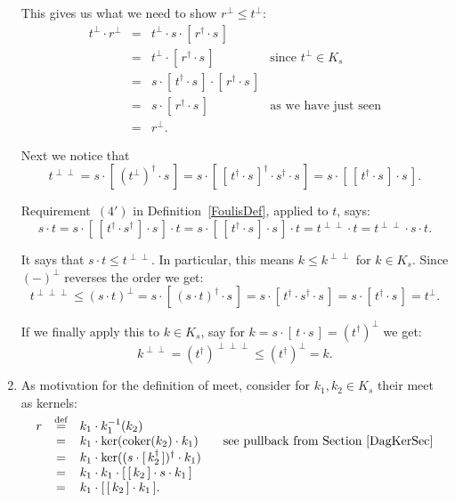 \documentclass{article}
\newenvironment{proof}[1][Proof]{ \begin{trivlist}\item[\hskip \labelsep {\bfseries #1}]}{ \end{trivlist}}
\newcommand{\coker}{\ensuremath{\mathrm{coker}}}
\newcommand{\sai}[1]{[\,#1\,]}
\begin{document}
\begin{proof}
\begin{enumerate}
\noindent This gives us what we need to show $r^{\perp} \leq t^{\perp}$:
$$\begin{array}{rcll}
t^{\perp}\cdot r^{\perp}
& = &
t^{\perp} \cdot s\cdot \sai{r^{\dag}\cdot s} \\
& = &
t^{\perp} \cdot \sai{r^{\dag}\cdot s} 
   & \mbox{since $t^{\perp}\in K_s$} \\
& = &
s\cdot \sai{t^{\dag}\cdot s}\cdot \sai{r^{\dag}\cdot s} \\
& = &
s\cdot \sai{r^{\dag}\cdot s}
   & \mbox{as we have just seen} \\
& = &
r^{\perp}.
\end{array}$$

Next we notice that 
$$t^{\perp\perp} 
= 
s\cdot \sai{(t^{\perp})^{\dag}\cdot s} 
=
s\cdot \sai{\sai{t^{\dag}\cdot s}^{\dag}\cdot s^{\dag} \cdot s}
=
s\cdot \sai{\sai{t^{\dag}\cdot s}\cdot s}.$$

\noindent Requirement~$(4')$ in Definition~\ref{FoulisDef}, applied to $t$, 
says:
$$s\cdot t 
= 
s\cdot \sai{\sai{t^{\dag}\cdot s^{\dag}}\cdot s}\cdot t
=
s\cdot \sai{\sai{t^{\dag}\cdot s}\cdot s}\cdot t
=
t^{\perp\perp} \cdot t
=
t^{\perp\perp} \cdot s\cdot t.$$

\noindent It says that $s\cdot t \leq t^{\perp\perp}$. In particular,
this means $k\leq k^{\perp\perp}$ for $k\in K_s$. Since $(-)^{\perp}$
reverses the order we get:
$$t^{\perp\perp\perp}
\leq 
(s\cdot t)^{\perp}
=
s\cdot \sai{(s\cdot t)^{\dag}\cdot s}
=
s\cdot \sai{t^{\dag}\cdot s^{\dag} \cdot s}
=
s\cdot \sai{t^{\dag} \cdot s}
=
t^{\perp}.$$

\noindent If we finally apply this to $k\in K_{s}$, say for
$k = s\cdot \sai{t\cdot s} = (t^{\dag})^{\perp}$ we get:
$$k^{\perp\perp}
=
(t^{\dag})^{\perp\perp\perp}
\leq
(t^{\dag})^{\perp}
=
k.$$

\item As motivation for the definition of meet, consider for $k_{1},
  k_{2}\in K_{s}$ their meet as kernels:
$$\begin{array}{rcl}
r
& \smash{\stackrel{\textrm{def}}{=}} &
k_{1}\cdot k_{1}^{-1}(k_{2}) \\
& = &
k_{1}\cdot \ker(\coker(k_{2})\cdot k_{1}) 
   \qquad\mbox{see pullback from Section~\ref{DagKerSec}} \\
& = &
k_{1}\cdot \ker((s\cdot \sai{k_{2}^{\dag}})^{\dag} \cdot k_{1}) \\
& = &
k_{1} \cdot k_{1} \cdot \sai{\sai{k_{2}}\cdot s \cdot k_{1}} \\
& = &
k_{1} \cdot \sai{\sai{k_{2}}\cdot k_{1}}.
\end{array}$$


\end{enumerate}
\end{proof}
\end{document}
